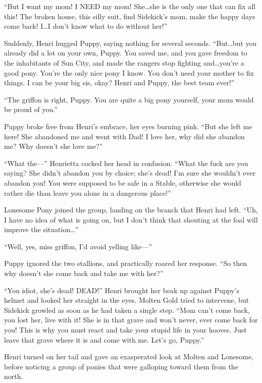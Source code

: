 ``But I want my mom! I NEED my mom! She\dots she is the only one that can fix all this! The broken house, this silly suit, find Sidekick's mom, make the happy days come back! I\dots I don't know what to do without her!''

Suddenly, Henri hugged Puppy, saying nothing for several seconds. ``But\dots but you already did a lot on your own, Puppy. You saved me, and you gave freedom to the inhabitants of Sun City, and made the rangers stop fighting and\dots you're a good pony. You're the only nice pony I know. You don't need your mother to fix things. I can be your big sis, okay? Henri and Puppy, the best team ever!''

``The griffon is right, Puppy. You are quite a big pony yourself, your mom would be proud of you.''

Puppy broke free from Henri's embrace, her eyes burning pink. ``But she left me here! She abandoned me and went with Dad! I love her, why did she abandon me? Why doesn't she love me?''

``What the---'' Henrietta cocked her head in confusion. ``What the fuck are you saying? She didn't abandon you by choice; she's dead! I'm sure she wouldn't ever abandon you! You were supposed to be safe in a Stable, otherwise she would rather die than leave you alone in a dangerous place!''

Lonesome Pony joined the group, landing on the branch that Henri had left. ``Uh, I have no idea of what is going on, but I don't think that shouting at the foal will improve the situation\dots''

``Well, yes, miss griffon, I'd avoid yelling like---''

Puppy ignored the two stallions, and practically roared her response. ``So then why doesn't she come back and take me with her?''

``You idiot, she's dead! DEAD!'' Henri brought her beak up against Puppy's helmet and looked her straight in the eyes. Molten Gold tried to intervene, but Sidekick growled as soon as he had taken a single step. ``Mom can't come back, you lost her, live with it! She is in that grave and won't never, ever come back for you! This is why you must react and take your stupid life in your hooves. Just leave that grave where it is and come with me. Let's go, Puppy.''

Henri turned on her tail and gave an exasperated look at Molten and Lonesome, before noticing a group of ponies that were galloping toward them from the north.

